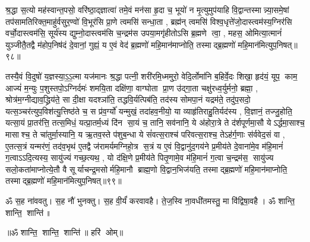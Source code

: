   श्र॒द्धा स॒त्यो मह॑स्वान्त॒पसो॒ वरि॑ष्ठा॒द्ज्ञात्वा॑ तमे॒वं मन॑सा हृ॒दा च॒ भूयो॑ न मृ॒त्युमुप॑याहि वि॒द्वान्तस्मान्न्या॒समे॒षां तप॑सामतिरिक्त॒माहु॑र्वसुर॒ण्वो॑ वि॒भूर॑सि प्रा॒णे त्वमसि॑ सन्धा॒ता \sep 
 ब्रह्म॑न् त्वमसि॑ विश्व॒धृत्ते॑जो॒दास्त्वम॑स्य॒ग्निर॑सि वर्चो॒दास्त्वम॑सि॒ सूर्य॑स्य द्युम्नो॒दास्त्वम॑सि च॒न्द्रम॑स उपया॒मगृ॑हीतोऽसि ब्र॒ह्मणे त्वा॒ \sep
 महस॒ ओमित्या॒त्मानं॑ युञ्जीतै॒तद्वै म॑होप॒निष॑दं दे॒वानां॒ गुह्यं॒ य ए॒वं वेद॑ ब्र॒ह्मणो॑ महि॒मान॑माप्नोति॒ तस्माद्ब्र॒ह्मणो॑ महि॒मान॑मित्युप॒निषत्॥९८॥\anuvakamend



तस्यै॒वं  वि॒दुषो॑ य॒ज्ञस्या॒ऽ॒ऽ॒त्मा यज॑मानः श्र॒द्धा पत्नी॒ शरी॑रमि॒ध्ममुरो॒ वेदि॒र्लोमा॑नि ब॒\ar{}हिर्वे॒दः शिखा॒ हृद॑यं॒ यूप॒ काम॒ आज्यं॑ म॒न्युः प॒शुस्तपो॒ऽग्निर्दमः॑ शमयि॒ता दक्षि॑णा॒ वाग्घोता प्रा॒ण उ॑द्गा॒ता चक्षु॑रध्व॒र्युर्मनो॒ ब्रह्मा॒ \sep 
श्रोत्र॑म॒ग्नीद्याव॒द्ध्रिय॑ते॒ सा दी॒क्षा यदश्ञा॑ति॒ तद्धवि॒र्यत्पिब॑ति॒ तद॑स्य सोमपा॒नं यद्रम॑ते॒ तदु॑प॒सदो॒ यत्स॒ञ्चर॑त्युप॒विश॑त्यु॒त्तिष्ठ॑ते च॒ स प्र॑व॒र्ग्यो॑ यन्मुखं॒ तदा॑हव॒नीयो॒ या व्याहृ॑तिराहु॒तिर्यद॑स्य \sep 
वि॒ज्ञानं॒ तज्जु॒होति॒ यत्सा॒यं प्रा॒तर॑त्ति॒ तत्स॒मिधं॒ यत्प्रा॒तर्म॒ध्यं दि॑न सा॒यं  च॒ तानि॒ सव॑नानि॒ ये अ॑होरा॒त्रे ते द॑र्\mbox{}शपूर्णमा॒सौ येऽर्द्धमा॒साश्च॒ मासाश्च॒ ते चा॑तुर्मा॒स्यानि॒ य ऋ॒तव॒स्ते प॑शुब॒न्धा ये सं॑वत्स॒राश्च॑ परिवत्स॒राश्च॒ तेऽह॑र्ग॒णाः स॑र्ववेद॒सं वा \sep 
ए॒तत्स॒त्रं यन्मर॑णं॒ तद॑व॒भृथ॑ ए॒तद्वै ज॑रामर्यमग्निहो॒त्र स॒त्रं य ए॒वं  वि॒द्वानु॑द॒गय॑ने प्र॒मीय॑ते दे॒वाना॑मे॒व म॑हि॒मानं॑ ग॒त्वाऽऽदि॒त्यस्य॒ सायु॑ज्यं गच्छ॒त्यथ॒ \sep
यो द॑क्षि॒णे प्र॒मीय॑ते पितृ॒णामे॒व म॑हि॒मानं॑ ग॒त्वा च॒न्द्रम॑स॒ सायु॑ज्य सलो॒कता॑माप्नोत्ये॒तौ वै सूर्याचन्द्र॒मसोर्महि॒मानौ ब्राह्म॒णो वि॒द्वान॒भिज॑यति॒ तस्माद्ब्र॒ह्मणो॑ महि॒मान॑माप्नोति॒ तस्माद्ब्र॒ह्मणो॑ महि॒मान॑मित्युप॒निषत्॥९९॥
\anuvakamend

ॐ स॒ह ना॑ववतु। 
स॒ह नौ॑ भुनक्तु। 
स॒ह वी॒र्यं॑ करवावहै। 
ते॒ज॒स्वि ना॒वधी॑तमस्तु॒ मा वि॑द्विषा॒वहै। 
ॐ शान्ति॒ शान्ति॒ शान्ति॑॥

\centerline{॥ॐ शान्ति॒ शान्ति॒ शान्ति॑॥ 
हरि॑ ओम्॥}

\closesection
\clearpage
